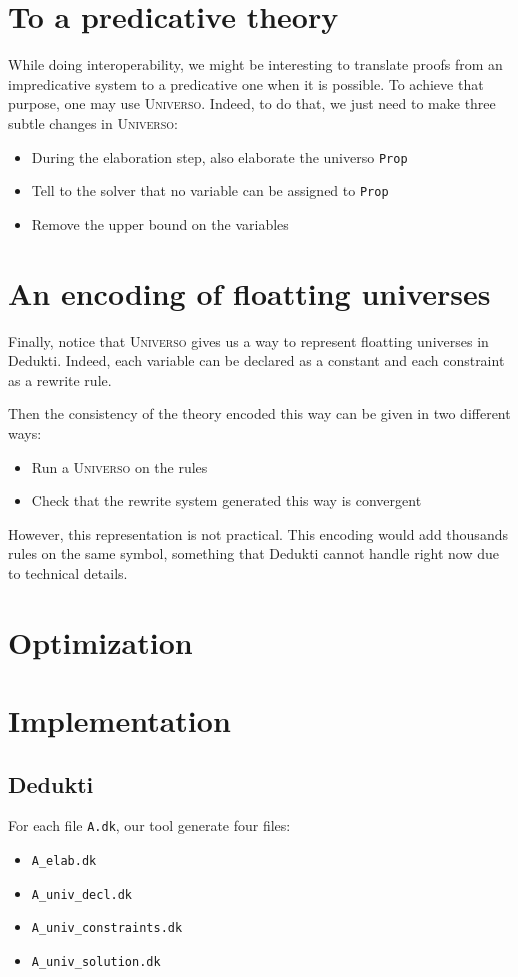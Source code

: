 \documentclass[conference]{IEEEtran}
\newcommand{\universo}{\textsc{Universo}}
\begin{document}
\section{To a predicative theory}

While doing interoperability, we might be interesting to translate proofs from an impredicative system to a predicative one when it is possible. To achieve that purpose, one may use \universo. Indeed, to do that, we just need to make three subtle changes in \universo:
\begin{itemize}
\item During the elaboration step, also elaborate the universo \texttt{Prop}
\item Tell to the solver that no variable can be assigned to \texttt{Prop}
\item Remove the upper bound on the variables
\end{itemize}

\section{An encoding of floatting universes}

Finally, notice that \universo{} gives us a way to represent floatting universes in Dedukti. Indeed, each variable can be declared as a constant and each constraint as a rewrite rule.

Then the consistency of the theory encoded this way can be given in two different ways:

\begin{itemize}
\item Run a \universo{} on the rules
\item Check that the rewrite system generated this way is convergent
\end{itemize}

However, this representation is not practical. This encoding would add thousands rules on the same symbol, something that Dedukti cannot handle right now due to technical details.

\section{Optimization}

\section{Implementation}

\subsection{Dedukti}
For each file \texttt{A.dk}, our tool generate four files:
\begin{itemize}
\item \texttt{A_elab.dk}
\item \texttt{A_univ_decl.dk}
\item \texttt{A_univ_constraints.dk}
\item \texttt{A_univ_solution.dk}
\end{itemize}
\end{document}

